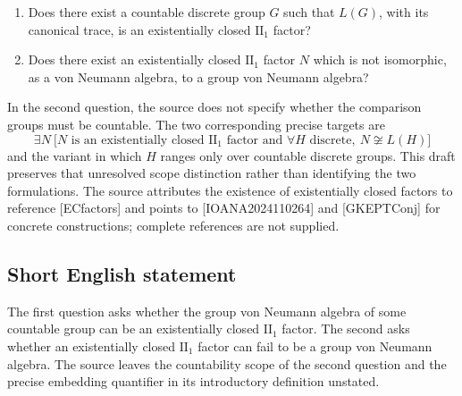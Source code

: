 \documentclass[11pt]{article}
\begin{document}
\begin{enumerate}
\item Does there exist a countable discrete group \(G\) such that \(L(G)\), with its canonical trace, is an existentially closed \(\mathrm{II}_1\) factor?
\item Does there exist an existentially closed \(\mathrm{II}_1\) factor \(N\) which is not isomorphic, as a von Neumann algebra, to a group von Neumann algebra?
\end{enumerate}
In the second question, the source does not specify whether the comparison groups must be countable. The two corresponding precise targets are
\[
\exists N\ \bigl[N\text{ is an existentially closed }\mathrm{II}_1\text{ factor and }
\forall H\text{ discrete},\ N\not\cong L(H)\bigr]
\]
and the variant in which \(H\) ranges only over countable discrete groups. This draft preserves that unresolved scope distinction rather than identifying the two formulations. The source attributes the existence of existentially closed factors to reference [ECfactors] and points to [IOANA2024110264] and [GKEPTConj] for concrete constructions; complete references are not supplied.
\subsection{Short English statement}
The first question asks whether the group von Neumann algebra of some countable group can be an existentially closed \(\mathrm{II}_1\) factor. The second asks whether an existentially closed \(\mathrm{II}_1\) factor can fail to be a group von Neumann algebra. The source leaves the countability scope of the second question and the precise embedding quantifier in its introductory definition unstated.
\end{document}
